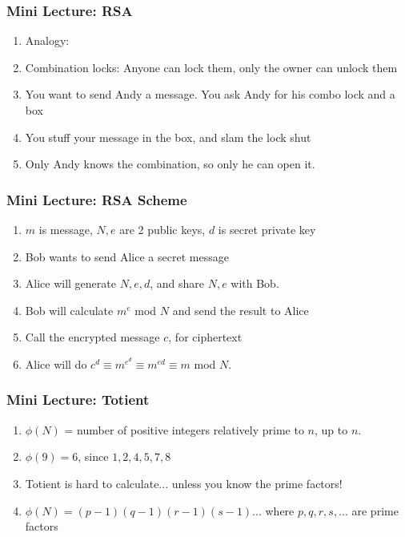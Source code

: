 \documentclass{beamer}
\begin{document}
\begin{frame}
    \frametitle{Mini Lecture: RSA}

    \begin{enumerate}[<+->]
        \item Analogy:
        \item Combination locks: Anyone can lock them, only the owner can unlock them
        \item You want to send Andy a message. You ask Andy for his combo lock and a box
        \item You stuff your message in the box, and slam the lock shut
        \item Only Andy knows the combination, so only he can open it.
    \end{enumerate}

\end{frame}

\begin{frame}
    \frametitle{Mini Lecture: RSA Scheme}

    \begin{enumerate}[<+->]
        \item $m$ is message, $N, e$ are 2 public keys, $d$ is secret private key
        \item Bob wants to send Alice a secret message
        \item Alice will generate $N, e, d$, and share $N, e$ with Bob.
        \item Bob will calculate $m^{e}$ mod $N$ and send the result to Alice
        \item Call the encrypted message $c$, for ciphertext
        \item Alice will do $c^{d} \equiv m^{e^{d}} \equiv m^{ed} \equiv m$ mod $N$.
    \end{enumerate}

\end{frame}

\begin{frame}
    \frametitle{Mini Lecture: Totient}

    \begin{enumerate}[<+->]
        \item $\phi(N)$ = number of positive integers relatively prime to $n$, up to $n$.
        \item $\phi(9) = 6$, since $1, 2, 4, 5, 7, 8$
        \item Totient is hard to calculate... unless you know the prime factors!
        \item $\phi(N) = (p-1)(q-1)(r-1)(s-1)...$ where $p,q,r,s, ...$ are prime factors
    \end{enumerate}

\end{frame}
\end{document}
